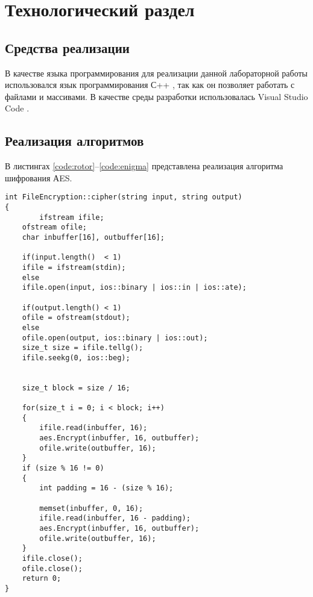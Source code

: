 \chapter{Технологический раздел}
\label{cha:impl}

\section{Средства реализации}

В качестве языка программирования для реализации данной лабораторной работы использовался язык программирования С++ \cite{cplusplus}, так как он позволяет работать с файлами и массивами. В качестве среды разработки использовалась Visual Studio Code \cite{vscode}.

\section{Реализация алгоритмов}

В листингах \ref{code:rotor}--\ref{code:enigma} представлена реализация алгоритма шифрования АES.

\begin{lstlisting}[label=code:rotor,caption=Функция шифрования файла]
int FileEncryption::cipher(string input, string output)
{
	    ifstream ifile;
	ofstream ofile;
	char inbuffer[16], outbuffer[16];
	
	if(input.length()  < 1) 
	ifile = ifstream(stdin);
	else
	ifile.open(input, ios::binary | ios::in | ios::ate);
	
	if(output.length() < 1) 
	ofile = ofstream(stdout);
	else
	ofile.open(output, ios::binary | ios::out);
	size_t size = ifile.tellg();
	ifile.seekg(0, ios::beg);
	
	
	size_t block = size / 16;
	
	for(size_t i = 0; i < block; i++)
	{
		ifile.read(inbuffer, 16);
		aes.Encrypt(inbuffer, 16, outbuffer);
		ofile.write(outbuffer, 16);
	}
	if (size % 16 != 0)
	{
		int padding = 16 - (size % 16);
		
		memset(inbuffer, 0, 16);
		ifile.read(inbuffer, 16 - padding);
		aes.Encrypt(inbuffer, 16, outbuffer);
		ofile.write(outbuffer, 16);
	}
	ifile.close();
	ofile.close();
	return 0;
}
\end{lstlisting}

